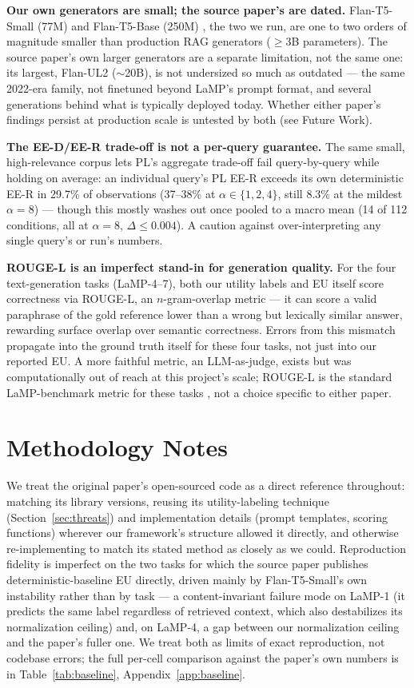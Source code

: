 \documentclass[10pt,twocolumn]{article}
\begin{document}
\textbf{Our own generators are small; the source paper's are dated.} Flan-T5-Small
(77M) and Flan-T5-Base (250M) \cite{chung2024scaling}, the two we run, are one to two
orders of magnitude smaller than production RAG generators ($\geq$3B parameters).
The source paper's own larger generators are a separate limitation, not the same
one: its largest, Flan-UL2 ($\sim$20B), is not undersized so much as outdated ---
the same 2022-era family, not finetuned beyond LaMP's prompt format, and several
generations behind what is typically deployed today. Whether either paper's findings
persist at production scale is untested by both (see Future Work).

\textbf{The EE-D/EE-R trade-off is not a per-query guarantee.} The same small,
high-relevance corpus lets PL's aggregate trade-off fail query-by-query while holding
on average: an individual query's PL EE-R exceeds its own deterministic EE-R in
29.7\% of observations (37--38\% at $\alpha\in\{1,2,4\}$, still 8.3\% at the mildest
$\alpha{=}8$) --- though this mostly washes out once pooled to a macro mean (14 of
112 conditions, all at $\alpha{=}8$, $\Delta \leq 0.004$). A caution against
over-interpreting any single query's or run's numbers.

\textbf{ROUGE-L is an imperfect stand-in for generation quality.} For the four
text-generation tasks (LaMP-4--7), both our utility labels and EU itself score
correctness via ROUGE-L, an $n$-gram-overlap metric --- it can score a valid
paraphrase of the gold reference lower than a wrong but lexically similar answer,
rewarding surface overlap over semantic correctness. Errors from this mismatch
propagate into the ground truth itself for these four tasks, not just into our
reported EU. A more faithful metric, an LLM-as-judge, exists but was computationally
out of reach at this project's scale; ROUGE-L is the standard LaMP-benchmark metric
for these tasks \cite{salemi2023lamp}, not a choice specific to either paper.

\section{Methodology Notes}
\label{sec:method}

We treat the original paper's open-sourced code as a direct reference throughout:
matching its library versions, reusing its utility-labeling technique
(Section~\ref{sec:threats}) and implementation details (prompt templates, scoring
functions) wherever our framework's structure allowed it directly, and otherwise
re-implementing to match its stated method as closely as we could. Reproduction
fidelity is imperfect on the two tasks for which the source paper publishes
deterministic-baseline EU directly, driven mainly by Flan-T5-Small's own
instability rather than by task --- a content-invariant failure mode on LaMP-1
(it predicts the same label regardless of retrieved context, which also
destabilizes its normalization ceiling) and, on LaMP-4, a gap between our
normalization ceiling and the paper's fuller one. We treat both as limits of
exact reproduction, not codebase errors; the full per-cell comparison against
the paper's own numbers is in Table~\ref{tab:baseline}, Appendix~\ref{app:baseline}.
\end{document}
